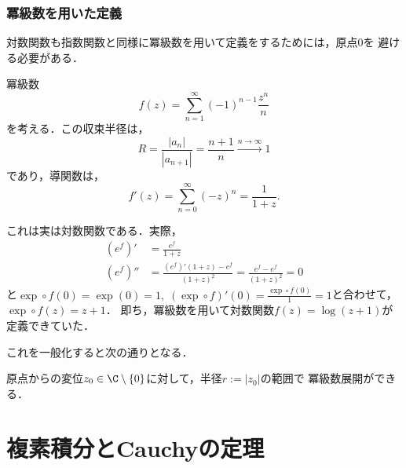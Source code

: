 \documentclass[uplatex, dvipdfmx]{jsreport}
\begin{document}
\subsection{冪級数を用いた定義}

対数関数も指数関数と同様に冪級数を用いて定義をするためには，原点$0$を
避ける必要がある．

\begin{discussion}
    冪級数
    \[ f(z)=\sum^\infty_{n=1}(-1)^{n-1}\frac{z^n}{n} \]
    を考える．この収束半径は，
    \[ R=\frac{|a_n|}{|a_{n+1}|}=\frac{n+1}{n}\xrightarrow{n\to\infty}1 \]
    であり，導関数は，
    \[  f'(z)=\sum^\infty_{n=0}(-z)^n=\frac{1}{1+z}. \]

    これは実は対数関数である．実際，
    \begin{align*}
        (e^f)' &= \frac{e^f}{1+z}\\
        (e^f)'' &= \frac{(e^f)'(1+z)-e^f}{(1+z)^2} = \frac{e^f-e^f}{(1+z)^2}=0
    \end{align*}
    と$\exp\circ f(0)=\exp(0)=1,\;(\exp\circ f)'(0)=\frac{\exp\circ f(0)}{1}=1$と合わせて，
    $\exp\circ f(z)=z+1$．
    即ち，冪級数を用いて対数関数$f(z)=\log (z+1)$が定義できていた．
\end{discussion}

これを一般化すると次の通りとなる．
\begin{definition}
    原点からの変位$z_0\in\C\setminus\{0\}$に対して，半径$r:=|z_0|$の範囲で
    冪級数展開ができる．
\end{definition}


\chapter{複素積分とCauchyの定理}
\end{document}
